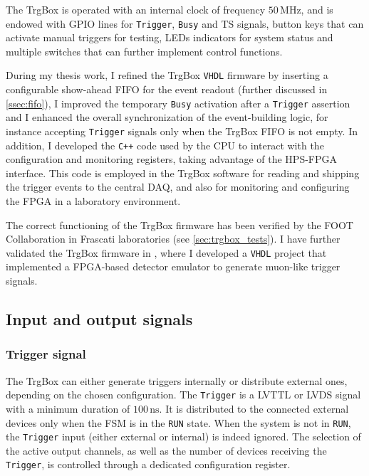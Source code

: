 The TrgBox is operated with an internal clock of frequency $50\,\mathrm{MHz}$, and is endowed with GPIO lines for \texttt{Trigger}, \texttt{Busy} and TS signals, button keys that can activate manual triggers for testing, LEDs indicators for system status and multiple switches that can further implement control functions.

During my thesis work, I refined the TrgBox \texttt{VHDL} firmware by inserting a configurable show-ahead FIFO for the event readout (further discussed in \autoref{ssec:fifo}), I improved the temporary \texttt{Busy} activation after a \texttt{Trigger} assertion and I enhanced the overall synchronization of the event-building logic, for instance accepting \texttt{Trigger} signals only when the TrgBox FIFO is not empty. In addition, I developed the \texttt{C++} code used by the CPU to interact with the configuration and monitoring registers, taking advantage of the HPS-FPGA interface. This code is employed in the TrgBox software for reading and shipping the trigger events to the central DAQ, and also for monitoring and configuring the FPGA in a laboratory environment.

The correct functioning of the TrgBox firmware has been verified by the FOOT Collaboration in Frascati laboratories \cite{Rabaglia2026BTF} (see \autoref{sec:trgbox_tests}). I have further validated the TrgBox firmware in \cite{simone_pasquini_2026_19881390}, where I developed a \texttt{VHDL} project that implemented a FPGA-based detector emulator to generate muon-like trigger signals.
\subsection{Input and output signals}\label{ssec:signals_trgbox} 
\subsubsection{Trigger signal}\label{sssec:trigger_signal}
The TrgBox can either generate triggers internally or distribute external ones, depending on the chosen configuration. The \texttt{Trigger} is a LVTTL or LVDS signal with a minimum duration of $100\,\mathrm{ns}$. It is distributed to the connected external devices only when the FSM is in the \texttt{RUN} state. When the system is not in \texttt{RUN}, the \texttt{Trigger} input (either external or internal) is indeed ignored. The selection of the active output channels, as well as the number of devices receiving the \texttt{Trigger}, is controlled through a dedicated configuration register.
